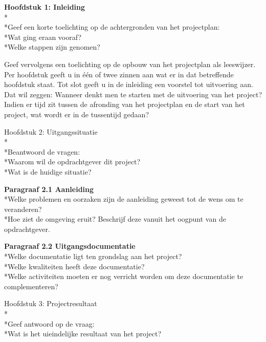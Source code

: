 \documentclass{article}
\begin{document}
\textbf{Hoofdstuk 1: Inleiding}
\\*
\\*Geef een korte toelichting op de achtergronden van het projectplan:
\\*Wat ging eraan vooraf?
\\*Welke stappen zijn genomen?
\newline

\noindent
Geef vervolgens een toelichting op de opbouw van het projectplan als leeswijzer. Per hoofdstuk geeft u in één of twee zinnen aan wat er in dat betreffende hoofdstuk staat. Tot slot geeft u in de inleiding een voorstel tot uitvoering aan.
Dat wil zeggen:
Wanneer denkt men te starten met de uitvoering van het project?
Indien er tijd zit tussen de afronding van het projectplan en de start van het project, wat wordt er in de tussentijd gedaan?
\newline
\newline

Hoofdstuk 2: Uitgangssituatie
\\*
\\*Beantwoord de vragen:
\\*Waarom wil de opdrachtgever dit project?
\\*Wat is de huidige situatie?
\newline

\noindent
\textbf{Paragraaf 2.1 Aanleiding}
\\*Welke problemen en oorzaken zijn de aanleiding geweest tot de wens om te veranderen?
\\*Hoe ziet de omgeving eruit? Beschrijf deze vanuit het oogpunt van de opdrachtgever.
\newline

\noindent
\textbf{Paragraaf 2.2 Uitgangsdocumentatie}
\\*Welke documentatie ligt ten grondslag aan het project?
\\*Welke kwaliteiten heeft deze documentatie?
\\*Welke activiteiten moeten er nog verricht worden om deze documentatie te complementeren?
\newline
\newline

Hoofdstuk 3: Projectresultaat
\\*
\\*Geef antwoord op de vraag:
\\*Wat is het uieindelijke resultaat van het project?
\newline
\end{document}
